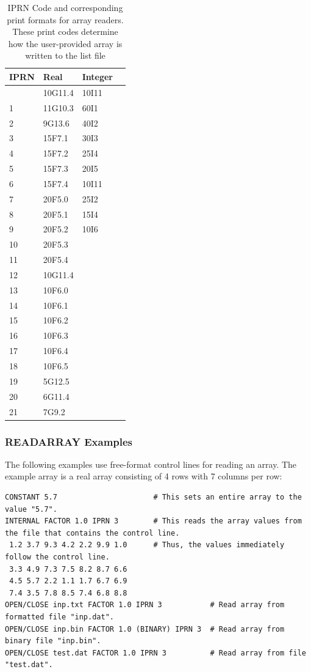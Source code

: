 \begin{longtable}{p{2cm} p{2cm} p{2cm} p{2cm}}
\caption{IPRN Code and corresponding print formats for array readers.  These print codes determine how the user-provided array is written to the list file} 
\tabularnewline
\hline
\hline
\textbf{IPRN} & \textbf{Real} & \textbf{Integer} \\
\hline
\endhead
\hline
\endfoot
0 & 10G11.4 & 10I11 \\
1 & 11G10.3 & 60I1 \\
2 & 9G13.6 & 40I2 \\
3 & 15F7.1 & 30I3 \\
4 & 15F7.2 & 25I4 \\
5 & 15F7.3 & 20I5 \\
6 & 15F7.4 & 10I11 \\
7 & 20F5.0 & 25I2 \\
8 & 20F5.1 & 15I4 \\
9 & 20F5.2 & 10I6 \\
10 & 20F5.3 &  \\
11 & 20F5.4 &  \\
12 & 10G11.4 & \\
13 & 10F6.0 &  \\
14 & 10F6.1 &  \\
15 & 10F6.2 &  \\
16 & 10F6.3 &  \\
17 & 10F6.4 &  \\
18 & 10F6.5 &  \\
19 & 5G12.5 &  \\
20 & 6G11.4 &  \\
21 & 7G9.2 &  \\
\end{longtable}


\subsubsection{READARRAY Examples}

The following examples use free-format control lines for reading an array. The example array is a real array consisting of 4 rows with 7 columns per row: 

\begin{lstlisting}[style=inputfile]
CONSTANT 5.7                      # This sets an entire array to the value "5.7". 
INTERNAL FACTOR 1.0 IPRN 3        # This reads the array values from the file that contains the control line. 
 1.2 3.7 9.3 4.2 2.2 9.9 1.0      # Thus, the values immediately follow the control line.
 3.3 4.9 7.3 7.5 8.2 8.7 6.6
 4.5 5.7 2.2 1.1 1.7 6.7 6.9 
 7.4 3.5 7.8 8.5 7.4 6.8 8.8 
OPEN/CLOSE inp.txt FACTOR 1.0 IPRN 3           # Read array from formatted file "inp.dat". 
OPEN/CLOSE inp.bin FACTOR 1.0 (BINARY) IPRN 3  # Read array from binary file "inp.bin". 
OPEN/CLOSE test.dat FACTOR 1.0 IPRN 3          # Read array from file "test.dat". 
\end{lstlisting}


